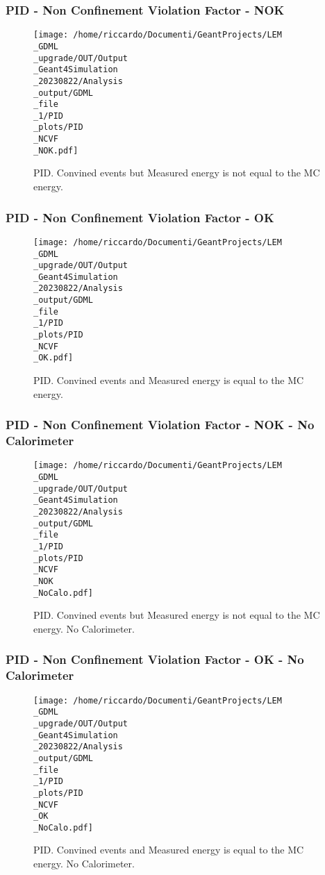 \documentclass[8pt]{beamer}
\begin{document}
            \begin{frame}
                \frametitle{PID - Non Confinement Violation Factor - NOK}
            
        \begin{figure}[h]
            \centering
            \texttt{[image: /home/riccardo/Documenti/GeantProjects/LEM\\\_GDML\\\_upgrade/OUT/Output\\\_Geant4Simulation\\\_20230822/Analysis\\\_output/GDML\\\_file\\\_1/PID\\\_plots/PID\\\_NCVF\\\_NOK.pdf]}
            \caption{PID. Convined events but Measured energy is not equal to the MC energy.}
        \end{figure}
        
            \end{frame}
            
            \begin{frame}
                \frametitle{PID - Non Confinement Violation Factor - OK}
            
        \begin{figure}[h]
            \centering
            \texttt{[image: /home/riccardo/Documenti/GeantProjects/LEM\\\_GDML\\\_upgrade/OUT/Output\\\_Geant4Simulation\\\_20230822/Analysis\\\_output/GDML\\\_file\\\_1/PID\\\_plots/PID\\\_NCVF\\\_OK.pdf]}
            \caption{PID. Convined events and Measured energy is equal to the MC energy.}
        \end{figure}
        
            \end{frame}
            
            \begin{frame}
                \frametitle{PID - Non Confinement Violation Factor - NOK - No Calorimeter}
            
        \begin{figure}[h]
            \centering
            \texttt{[image: /home/riccardo/Documenti/GeantProjects/LEM\\\_GDML\\\_upgrade/OUT/Output\\\_Geant4Simulation\\\_20230822/Analysis\\\_output/GDML\\\_file\\\_1/PID\\\_plots/PID\\\_NCVF\\\_NOK\\\_NoCalo.pdf]}
            \caption{PID. Convined events but Measured energy is not equal to the MC energy. No Calorimeter.}
        \end{figure}
        
            \end{frame}
            
            \begin{frame}
                \frametitle{PID - Non Confinement Violation Factor - OK - No Calorimeter}
            
        \begin{figure}[h]
            \centering
            \texttt{[image: /home/riccardo/Documenti/GeantProjects/LEM\\\_GDML\\\_upgrade/OUT/Output\\\_Geant4Simulation\\\_20230822/Analysis\\\_output/GDML\\\_file\\\_1/PID\\\_plots/PID\\\_NCVF\\\_OK\\\_NoCalo.pdf]}
            \caption{PID. Convined events and Measured energy is equal to the MC energy. No Calorimeter.}
        \end{figure}
        
            \end{frame}
            
\end{document}
